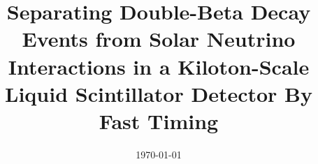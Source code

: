 



\graphicspath{{figs/}}

\linenumbers
{}
%

\large

\title{Separating Double-Beta Decay Events from Solar Neutrino
Interactions in a Kiloton-Scale Liquid Scintillator Detector By Fast Timing}


\begin{abstract}

\end{abstract}

\date{\today}

\maketitle

\newpage
\tableofcontents
\newpage

\linenumbers\relax %






\begin{comment}
\clearpage %

\clearpage %


\clearpage %


\clearpage %


\clearpage %

\section*{Acknowledgements}


\end{comment}

